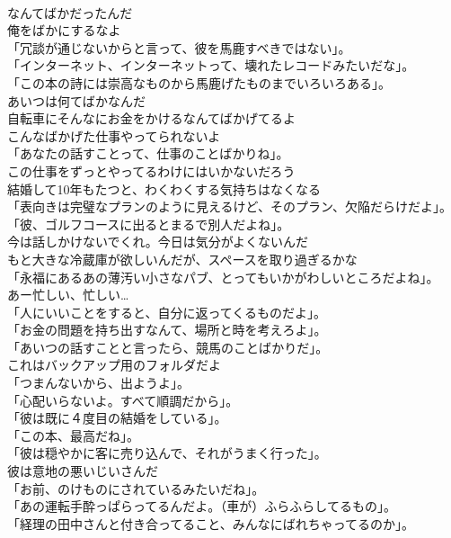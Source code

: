 \documentclass[8pt]{extreport}
\begin{document}
\begin{CJK}{UTF8}{min}
\\	なんてばかだったんだ	
\\	俺をばかにするなよ	
\\	「冗談が通じないからと言って、彼を馬鹿すべきではない」。	
\\	「インターネット、インターネットって、壊れたレコードみたいだな」。	
\\	「この本の詩には崇高なものから馬鹿げたものまでいろいろある」。	
\\	あいつは何てばかなんだ	
\\	自転車にそんなにお金をかけるなんてばかげてるよ	
\\	こんなばかげた仕事やってられないよ	
\\	「あなたの話すことって、仕事のことばかりね」。	
\\	この仕事をずっとやってるわけにはいかないだろう	
\\	結婚して10年もたつと、わくわくする気持ちはなくなる	
\\	「表向きは完璧なプランのように見えるけど、そのプラン、欠陥だらけだよ」。	
\\	「彼、ゴルフコースに出るとまるで別人だよね」。	
\\	今は話しかけないでくれ。今日は気分がよくないんだ	
\\	もと大きな冷蔵庫が欲しいんだが、スペースを取り過ぎるかな	
\\	「永福にあるあの薄汚い小さなパブ、とってもいかがわしいところだよね」。	
\\	あー忙しい、忙しい…	
\\	「人にいいことをすると、自分に返ってくるものだよ」。	
\\	「お金の問題を持ち出すなんて、場所と時を考えろよ」。	
\\	「あいつの話すことと言ったら、競馬のことばかりだ」。	
\\	これはバックアップ用のフォルダだよ	
\\	「つまんないから、出ようよ」。	
\\	「心配いらないよ。すべて順調だから」。	
\\	「彼は既に４度目の結婚をしている」。	
\\	「この本、最高だね」。	
\\	「彼は穏やかに客に売り込んで、それがうまく行った」。	
\\	彼は意地の悪いじいさんだ	
\\	「お前、のけものにされているみたいだね」。	
\\	「あの運転手酔っぱらってるんだよ。（車が）ふらふらしてるもの」。	
\\	「経理の田中さんと付き合ってること、みんなにばれちゃってるのか」。	

\end{CJK}
\end{document}
